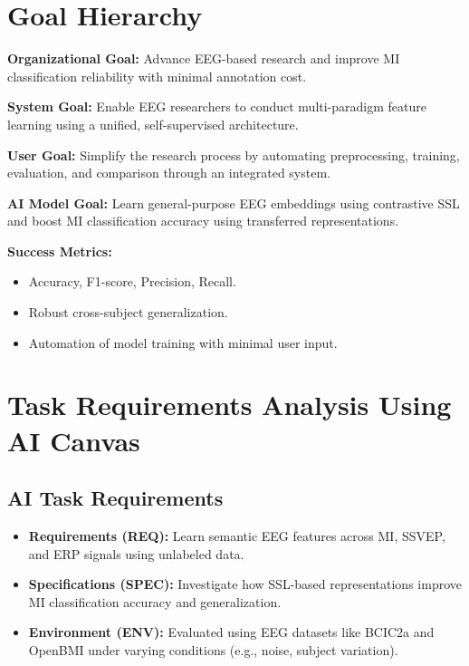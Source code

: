 \section{Goal Hierarchy}
\label{sec:goal-hierarchy}

\noindent\textbf{Organizational Goal:} Advance EEG-based research and improve MI classification reliability with minimal annotation cost.

\vspace{0.5em}
\noindent\textbf{System Goal:} Enable EEG researchers to conduct multi-paradigm feature learning using a unified, self-supervised architecture.

\vspace{0.5em}
\noindent\textbf{User Goal:} Simplify the research process by automating preprocessing, training, evaluation, and comparison through an integrated system.

\vspace{0.5em}
\noindent\textbf{AI Model Goal:} Learn general-purpose EEG embeddings using contrastive SSL and boost MI classification accuracy using transferred representations.

\vspace{1em}
\noindent\textbf{Success Metrics:}
\begin{itemize}
    \item Accuracy, F1-score, Precision, Recall.
    \item Robust cross-subject generalization.
    \item Automation of model training with minimal user input.
\end{itemize}

\section{Task Requirements Analysis Using AI Canvas}
\label{sec:ai-canvas}

\subsection{AI Task Requirements}
\label{subsec:ai-task-requirements}
\begin{itemize}[leftmargin=3.5em]
    \item \textbf{Requirements (REQ):} Learn semantic EEG features across MI, SSVEP, and ERP signals using unlabeled data.
    \item \textbf{Specifications (SPEC):} Investigate how SSL-based representations improve MI classification accuracy and generalization.
    \item \textbf{Environment (ENV):} Evaluated using EEG datasets like BCIC2a and OpenBMI under varying conditions (e.g., noise, subject variation).
\end{itemize}

